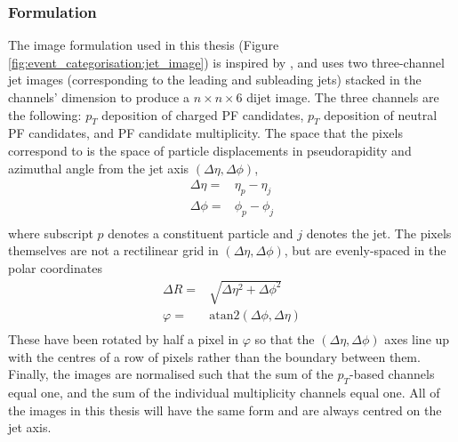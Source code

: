 \subsubsection{Formulation}
The image formulation used in this thesis (Figure \ref{fig:event_categorisation:jet_image}) is inspired by \cite{JetsInColour}, and uses two three-channel jet images (corresponding to the leading and subleading jets) stacked in the channels' dimension to produce a $n\times{}n\times{}6$ dijet image.
The three channels are the following: $p_T$ deposition of charged PF candidates, $p_T$ deposition of neutral PF candidates, and PF candidate multiplicity.
The space that the pixels correspond to is the space of particle displacements in pseudorapidity and azimuthal angle from the jet axis $(\Delta\eta,\Delta\phi)$,
\begin{equation}
    \begin{split}
        \Delta\eta =& \eta_{p} - \eta_{j} \\ 
        \Delta\phi =& \phi_{p} - \phi_{j} \\
    \end{split}
    \label{eq:event_categorisation:pixel_coords}
\end{equation}
where subscript $p$ denotes a constituent particle and $j$ denotes the jet. 
The pixels themselves are not a rectilinear grid in $(\Delta\eta,\Delta\phi)$, but are evenly-spaced in the polar coordinates 
\begin{equation}
    \begin{split}
        \Delta{R} =& \sqrt{\Delta\eta^2 + \Delta\phi^2} \\
        \varphi   =& \mathrm{atan2}(\Delta\phi,\Delta\eta) \\
    \end{split}
    \label{eq:event_categorisation:pixel_coords}
\end{equation}
These have been rotated by half a pixel in $\varphi$ so that the $(\Delta\eta,\Delta\phi)$ axes line up with the centres of a row of pixels rather than the boundary between them. 
Finally, the images are normalised such that the sum of the $p_T$-based channels equal one, and the sum of the individual multiplicity channels equal one. 
All of the images in this thesis will have the same form and are always centred on the jet axis.

